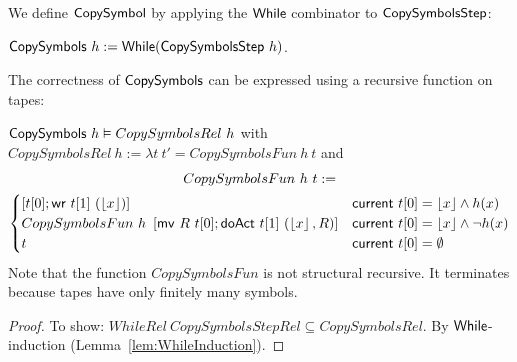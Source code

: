 We define $\mathsf{CopySymbol}$ by applying the $\mathsf{While}$ combinator to $\mathsf{CopySymbolsStep}$:
\begin{definition}[$\MS{CopySymbols}$]
  \label{def:CopySymbols}
  $\mathsf{CopySymbols}~h := \mathsf{While}(\mathsf{CopySymbolsStep}~h)$.
\end{definition}

The correctness of $\MS{CopySymbols}$ can be expressed using a recursive function on tapes:
\begin{lemma}
  \label{lem:CopySymbols_Realise}
  $\mathsf{CopySymbols}~h \mathrel{\vDash} CopySymbolsRel~h$
  with $CopySymbolsRel~h := \lambda t~t' = CopySymbolsFun~h~t$ and
  {
    \small
    \begin{multline*}
      CopySymbolsFun~h~t :=\\
      \begin{cases}
        \left[ t[0]; \mathsf{wr}~t[1]~(\left\lfloor {x} \right\rfloor) \right]                                  & \mathsf{current}~t[0]=\left\lfloor {x} \right\rfloor \land h(x) \\
        CopySymbolsFun~h~\left[ \mathsf{mv}~R~t[0]; \mathsf{doAct}~t[1]~(\left\lfloor {x} \right\rfloor, R) \right] & \mathsf{current}~t[0]=\left\lfloor {x} \right\rfloor \land \lnot h(x) \\
        t                                                                       & \mathsf{current}~t[0]=\emptyset
      \end{cases}
    \end{multline*}
  }
  Note that the function $CopySymbolsFun$ is not structural recursive.  It terminates because tapes have only finitely many symbols.
\end{lemma}
\begin{proof}
  To show: $WhileRel~CopySymbolsStepRel \subseteq CopySymbolsRel$.  By $\mathsf{While}$-induction (Lemma~\ref{lem:WhileInduction}).
\end{proof}

